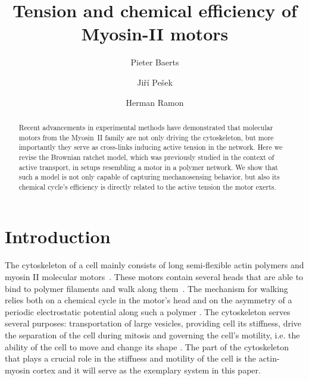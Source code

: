\documentclass[aps,pre,twocolumn,showpacs,showkeys,superscriptaddress,floatfix]{revtex4-1}
\begin{document}
 

\title{Tension and chemical efficiency of Myosin-II motors}
\author{Pieter Baerts}
\author{Jiří Pešek}
\author{Herman Ramon}


\begin{abstract}
Recent advancements in experimental methods have demonstrated that molecular motors from the Myosin~II family are not only driving the cytoskeleton, 
but more importantly they serve as cross-links inducing active tension in the network. 
Here we revise the Brownian ratchet model, 
which was previously studied in the context of active transport, 
in setups resembling a motor in a polymer network.
We show that such a model is not only capable of capturing mechanosensing behavior,
but also its chemical cycle's efficiency is directly related to the active tension the motor exerts.  
\end{abstract}

\maketitle 

\section{Introduction}
The cytoskeleton of a cell mainly consists of long semi-flexible actin polymers and myosin II molecular motors~\cite{mitchison1996actin}. 
These motors contain several heads that are able to bind to polymer filaments and walk along them~\cite{pollard1982structure}. 
The mechanism for walking relies both on a chemical cycle in the motor's head and on the asymmetry of a periodic electrostatic potential along such a polymer \cite{Reimann2002introduction}. 
The cytoskeleton serves several purposes: 
transportation of large vesicles, providing cell its stiffness, drive the separation of the cell during mitosis and governing the cell's motility, i.e. the ability of the cell to move and change its shape \cite{ross2008cargo,mitchison1996actin,rosenblatt2004myosin}.
The part of the cytoskeleton that plays a crucial role in the stiffness and motility of the cell is the actin-myosin cortex \cite{vicente2009non} and it will serve as the exemplary system in this paper.
\end{document}

